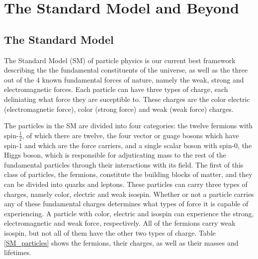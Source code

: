 \chapter{The Standard Model and Beyond}
\section{The Standard Model}

The Standard Model (SM) of particle physics is our current best framework describing the the fundamental constituents of the universe, as well as the three out of the 4 known fundamental forces of nature, namely the weak, strong and electromagnetic forces. Each particle can have three types of charge, each deliniating what force they are suceptible to. These charges are the color electric (electromagnetic force), color (strong force) and weak (weak force) charges.

The particles in the SM are divided into four categories: the twelve fermions with spin-$\frac12$, of which there are twelve, the four vector or guage bosons which have spin-$1$ and which are the force carriers, and a single scalar boson with spin-$0$, the Higgs boson, which is responsible for adjuticating mass to the rest of the fundamental particles through their interactions with its field. The first of this class of particles, the fermions, constitute the building blocks of matter, and they can be divided into quarks and leptons. These particles can carry three types of charges, namely color, electric and weak isospin. Whether or not a particle carries any of these fundamental charges determines what types of force it is capable of experiencing. A particle with color, electric and isospin can experience the strong, electromagnetic and weak force, respectively. All of the fermions carry weak isospin, but not all of them have the other two types of charge. Table \ref{SM_particles} shows the fermions, their charges, as well as their masses and lifetimes.





